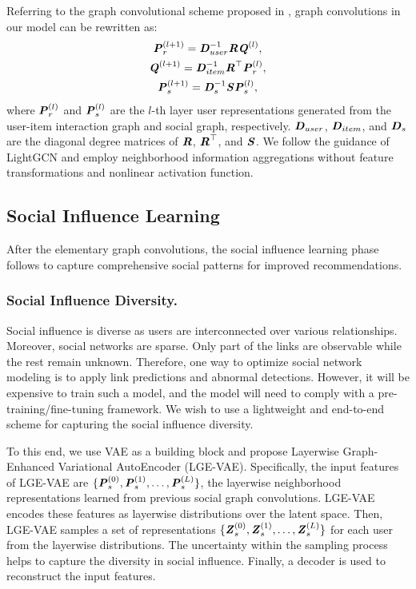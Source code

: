 \documentclass[letterpaper]{article} %
\begin{document}
Referring to the graph convolutional scheme proposed in \cite{GCN}, graph convolutions in our model can be rewritten as:
\begin{gather}
    \textbf{\textit{P}}^{(l+1)}_{r} = \textbf{\textit{D}}^{-1}_{user}\textbf{\textit{R}}\textbf{\textit{Q}}^{(l)},\\
    \textbf{\textit{Q}}^{(l+1)} = \textbf{\textit{D}}^{-1}_{item}\textbf{\textit{R}}^{\top}\textbf{\textit{P}}^{(l)}_{r},\\
    \textbf{\textit{P}}^{(l+1)}_{s} = \textbf{\textit{D}}^{-1}_{s}\textbf{\textit{S}}\textbf{\textit{P}}^{(l)}_{s},
\end{gather}
where $\textbf{\textit{P}}^{(l)}_{r}$ and $\textbf{\textit{P}}^{(l)}_{s}$ are the $l$-th layer user representations generated from the user-item interaction graph and social graph, respectively. $\textbf{\textit{D}}_{user}$, $\textbf{\textit{D}}_{item}$, and $\textbf{\textit{D}}_{s}$ are the diagonal degree matrices of $\textbf{\textit{R}}$, $\textbf{\textit{R}}^{\top}$, and $\textbf{\textit{S}}$. We follow the guidance of LightGCN \cite{lightgcn} and employ neighborhood information aggregations without feature transformations and nonlinear activation function. 

\subsection{Social Influence Learning}
After the elementary graph convolutions, the social influence learning phase follows to capture comprehensive social patterns for improved recommendations.
\subsubsection{Social Influence Diversity.}
Social influence is diverse as users are interconnected over various relationships. Moreover, social networks are sparse. Only part of the links are observable while the rest remain unknown. Therefore, one way to optimize social network modeling is to apply link predictions and abnormal detections. However, it will be expensive to train such a model, and the model will need to comply with a pre-training/fine-tuning framework. We wish to use a lightweight and end-to-end scheme for capturing the social influence diversity. 

To this end, we use VAE \cite{VAE} as a building block and propose Layerwise Graph-Enhanced Variational AutoEncoder (LGE-VAE). Specifically, the input features of LGE-VAE are $\{\textbf{\textit{P}}^{(0)}_{s}, \textbf{\textit{P}}^{(1)}_{s}, \ldots, \textbf{\textit{P}}^{(L)}_{s}\}$, the layerwise neighborhood representations learned from previous social graph convolutions. LGE-VAE encodes these features as layerwise distributions over the latent space. Then, LGE-VAE samples a set of representations $\{\textbf{\textit{Z}}_s^{(0)}, \textbf{\textit{Z}}_s^{(1)}, \ldots, \textbf{\textit{Z}}_s^{(L)}\}$ for each user from the layerwise distributions. The uncertainty within the sampling process helps to capture the diversity in social influence. Finally, a decoder is used to reconstruct the input features. 
\end{document}
